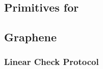 \subsection{Primitives for \name}
\label{subsec:primitive}

\subsection{Graphene}
\label{subsec:graphenec}


\subsubsection{Linear Check Protocol}
\vspace{-0.4cm}
